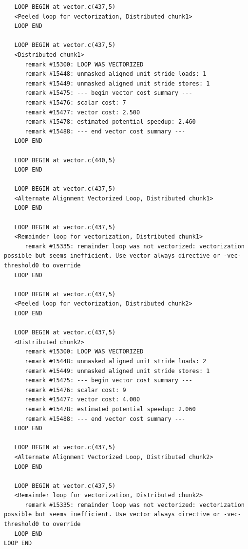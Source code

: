 \documentclass[11pt]{article}
\begin{document}
\begin{enumerate}
\begin{lstlisting}
   LOOP BEGIN at vector.c(437,5)
   <Peeled loop for vectorization, Distributed chunk1>
   LOOP END

   LOOP BEGIN at vector.c(437,5)
   <Distributed chunk1>
      remark #15300: LOOP WAS VECTORIZED
      remark #15448: unmasked aligned unit stride loads: 1 
      remark #15449: unmasked aligned unit stride stores: 1 
      remark #15475: --- begin vector cost summary ---
      remark #15476: scalar cost: 7 
      remark #15477: vector cost: 2.500 
      remark #15478: estimated potential speedup: 2.460 
      remark #15488: --- end vector cost summary ---
   LOOP END

   LOOP BEGIN at vector.c(440,5)
   LOOP END

   LOOP BEGIN at vector.c(437,5)
   <Alternate Alignment Vectorized Loop, Distributed chunk1>
   LOOP END

   LOOP BEGIN at vector.c(437,5)
   <Remainder loop for vectorization, Distributed chunk1>
      remark #15335: remainder loop was not vectorized: vectorization possible but seems inefficient. Use vector always directive or -vec-threshold0 to override 
   LOOP END

   LOOP BEGIN at vector.c(437,5)
   <Peeled loop for vectorization, Distributed chunk2>
   LOOP END

   LOOP BEGIN at vector.c(437,5)
   <Distributed chunk2>
      remark #15300: LOOP WAS VECTORIZED
      remark #15448: unmasked aligned unit stride loads: 2 
      remark #15449: unmasked aligned unit stride stores: 1 
      remark #15475: --- begin vector cost summary ---
      remark #15476: scalar cost: 9 
      remark #15477: vector cost: 4.000 
      remark #15478: estimated potential speedup: 2.060 
      remark #15488: --- end vector cost summary ---
   LOOP END

   LOOP BEGIN at vector.c(437,5)
   <Alternate Alignment Vectorized Loop, Distributed chunk2>
   LOOP END

   LOOP BEGIN at vector.c(437,5)
   <Remainder loop for vectorization, Distributed chunk2>
      remark #15335: remainder loop was not vectorized: vectorization possible but seems inefficient. Use vector always directive or -vec-threshold0 to override 
   LOOP END
LOOP END
\end{lstlisting}


\end{enumerate}
\end{document}

